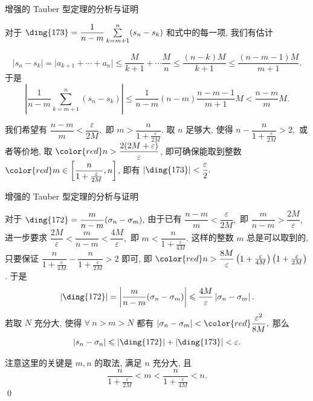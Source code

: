 
\begin{frame}{增强的 Tauber 型定理的分析与证明}

对于 $\text{\ding{173}} = \dfrac{1}{n-m} \sum\limits_{k=m+1}^{n} (s_n - s_k)$ 和式中的每一项, 我们有估计

\[
\lvert s_n - s_k \rvert = \lvert a_{k+1} + \cdots + a_n \rvert
\leqslant \dfrac{M}{k+1} + \cdots \dfrac{M}{n} \leqslant \dfrac{(n-k)M}{k+1} \leqslant \dfrac{(n-m-1)M}{m+1}.
\]
于是
\[
\left\lvert \dfrac{1}{n-m} \sum\limits_{k=m+1}^{n} (s_n - s_k) \right\rvert \leqslant \dfrac{1}{n-m} (n-m) \dfrac{n-m-1}{m+1} M < \dfrac{n-m}{m} M.
\]

\pause

我们希望有 $\dfrac{n-m}{m} < \dfrac{\varepsilon}{2M},$ 即 $m > \dfrac{n}{1 + \frac{\varepsilon}{2M}}.$ 取 $n$ 足够大, 使得 $n - \dfrac{n}{1 + \frac{\varepsilon}{2M}} > 2,$ 或者等价地, 取 $\color{red} n > \dfrac{2(2M + \varepsilon)}{\varepsilon}$, 即可确保能取到整数 $\color{red} m \in \left[ \dfrac{n}{1 + \frac{\varepsilon}{2M}}, n \right]$,
即有 $\lvert \text{\ding{173}} \rvert < \dfrac{\varepsilon}{2}.$

\end{frame}


\begin{frame}{增强的 Tauber 型定理的分析与证明}

对于 $\text{\ding{172}} = \dfrac{m}{n - m}(\sigma_n - \sigma_m),$ 由于已有 $\dfrac{n-m}{m} < \dfrac{\varepsilon}{2M},$ 即 $\dfrac{m}{n-m} > \dfrac{2M}{\varepsilon},$ 进一步要求 $\dfrac{2M}{\varepsilon} < \dfrac{m}{n-m} < \dfrac{4M}{\varepsilon},$ 即 $m < \dfrac{n}{1 + \frac{\varepsilon}{4M}}.$
\pause
这样的整数 $m$ 总是可以取到的, 只要保证 $\dfrac{n}{1 + \frac{\varepsilon}{4M}} - \dfrac{n}{1 + \frac{\varepsilon}{2M}} > 2$ 即可, 即 $\color{red} n > \dfrac{8M}{\varepsilon}\left(1 + \frac{\varepsilon}{4M}\right)\left(1 + \frac{\varepsilon}{2M}\right)$.
\pause
于是
\[\lvert \text{\ding{172}} \rvert = \left\lvert \dfrac{m}{n - m}(\sigma_n - \sigma_m) \right\rvert \leqslant \dfrac{4M}{\varepsilon} \left\lvert \sigma_n - \sigma_m \right\rvert.\]
若取 $N$ 充分大, 使得 $\forall~n > m > N$ 都有 $\left\lvert \sigma_n - \sigma_m \right\rvert < {\color{red} \dfrac{\varepsilon^2}{8M}},$ 那么
\[\left\lvert s_n - \sigma_n \right\rvert \leqslant \lvert \text{\ding{172}} \rvert + \lvert \text{\ding{173}} \rvert < \varepsilon.\]

\pause

注意这里的关键是 $m, n$ 的取法, 满足 $n$ 充分大, 且
\[\dfrac{n}{1 + \frac{\varepsilon}{2M}} < m < \dfrac{n}{1 + \frac{\varepsilon}{4M}} < n.\]
\qed

\end{frame}

